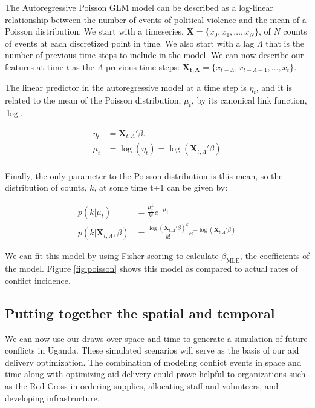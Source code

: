 \documentclass{article} %
\begin{document}
The Autoregressive Poisson GLM model can be described as a log-linear relationship between the number of events of political violence and the mean of a Poisson distribution. We start with a timeseries, $\mathbf{X} = \{x_0, x_1,\hdots, x_N\}$, of $N$ counts of events at each discretized point in time. We also start with a lag $\Lambda$ that is the number of previous time steps to include in the model. We can now describe our features at time $t$ as the $\Lambda$ previous time steps: $\mathbf{X_{t, \Lambda}} = \{x_{t-\Lambda}, x_{t-\Lambda-1},\hdots, x_t\}$.

The linear predictor in the autoregressive model at a time step is $\eta_t$, and it is related to the mean of the Poisson distribution, $\mu_t$, by its canonical link function, $\log$.

\begin{align*}
\eta_t &= \mathbf{X}_{t, \Lambda}'\beta. \\
\mu_t &= \log(\eta_t) = \log(\mathbf{X}_{t, \Lambda}'\beta) \\
\end{align*}

Finally, the only parameter to the Poisson distribution is this mean, so the distribution of counts, $k$, at some time t+1 can be given by:

\begin{align*}
p(k | \mu_t) &= \frac{\mu_t^k}{k!}e^{-\mu_t} \\
p(k | \mathbf{X}_{t, \Lambda}, \beta) &= \frac{\log(\mathbf{X}_{t, \Lambda}'\beta)^k}{k!}e^{-\log(\mathbf{X}_{t, \Lambda}'\beta)} 
\end{align*}

We can fit this model by using Fisher scoring to calculate $\beta_\mathrm{MLE}$, the coefficients of the model. Figure \ref{fig:poisson} shows this model as compared to actual rates of conflict incidence.


\subsection{Putting together the spatial and temporal}

We can now use our draws over space and time to generate a simulation of future conflicts in Uganda. These simulated scenarios will serve as the basis of our aid delivery optimization. The combination of modeling conflict events in space and time along with optimizing aid delivery could prove helpful to organizations such as the Red Cross in ordering supplies, allocating staff and volunteers, and developing infrastructure.
\end{document}
